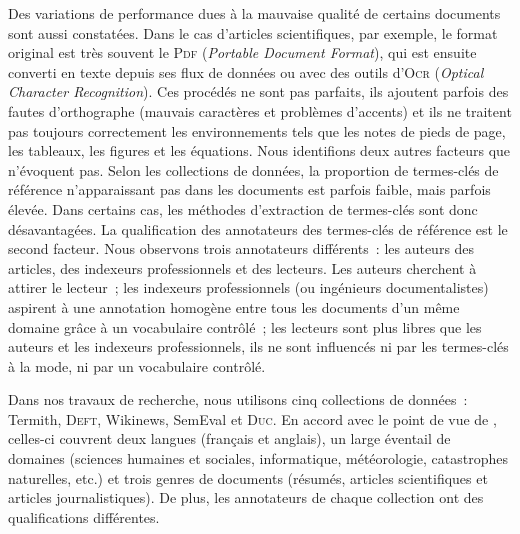     Des variations de performance dues à la mauvaise qualité de certains
    documents sont aussi constatées. Dans le cas d'articles scientifiques, par
    exemple, le format original est très souvent le \textsc{Pdf}
    (\textit{Portable Document Format}), qui est ensuite converti en texte
    depuis ses flux de données ou avec des outils d'\textsc{Ocr}
    (\textit{Optical Character Recognition}). Ces procédés ne sont pas parfaits,
    ils ajoutent parfois des fautes d'orthographe (mauvais caractères et
    problèmes d'accents) et ils ne traitent pas toujours correctement les
    environnements tels que les notes de pieds de page, les tableaux, les
    figures et les équations. Nous identifions deux autres facteurs que
     n'évoquent pas. Selon les collections de
    données, la proportion de termes-clés de référence n'apparaissant pas dans
    les documents est parfois faible, mais parfois élevée. Dans certains
    cas, les méthodes d'extraction de termes-clés sont donc désavantagées. La
    qualification des annotateurs des termes-clés de référence est le second
    facteur. Nous observons trois annotateurs différents~: les auteurs des
    articles, des indexeurs professionnels et des lecteurs. Les auteurs
    cherchent à attirer le lecteur~; les indexeurs professionnels (ou ingénieurs
    documentalistes) aspirent à une annotation homogène entre tous les documents
    d'un même domaine grâce à un vocabulaire contrôlé~; les lecteurs sont plus
    libres que les auteurs et les indexeurs professionnels, ils ne sont
    influencés ni par les termes-clés \og{}à la mode\fg{}, ni par un vocabulaire
    contrôlé.

    Dans nos travaux de recherche, nous utilisons cinq collections de données~:
    Termith, \textsc{Deft}, Wikinews, SemEval et \textsc{Duc}. En accord avec le
    point de vue de , celles-ci couvrent deux
    langues (français et anglais), un large éventail de domaines (sciences
    humaines et sociales, informatique, météorologie, catastrophes naturelles,
    etc.) et trois genres de documents (résumés, articles scientifiques et
    articles journalistiques). De plus, les annotateurs de chaque collection ont
    des qualifications différentes.


